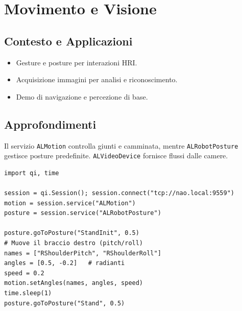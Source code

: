 \chapter{Movimento e Visione}

\section{Contesto e Applicazioni}
\begin{tcolorbox}[title=Contesto e Applicazioni]
\begin{itemize}
  \item Gesture e posture per interazioni HRI.
  \item Acquisizione immagini per analisi e riconoscimento.
  \item Demo di navigazione e percezione di base.
\end{itemize}
\end{tcolorbox}

\section{Approfondimenti}
Il servizio \texttt{ALMotion} controlla giunti e camminata, mentre \texttt{ALRobotPosture} gestisce posture predefinite. \texttt{ALVideoDevice} fornisce flussi dalle camere.

\begin{tcolorbox}[title=Esempi di movimento]
\begin{lstlisting}
import qi, time

session = qi.Session(); session.connect("tcp://nao.local:9559")
motion = session.service("ALMotion")
posture = session.service("ALRobotPosture")

posture.goToPosture("StandInit", 0.5)
# Muove il braccio destro (pitch/roll)
names = ["RShoulderPitch", "RShoulderRoll"]
angles = [0.5, -0.2]   # radianti
speed = 0.2
motion.setAngles(names, angles, speed)
time.sleep(1)
posture.goToPosture("Stand", 0.5)
\end{lstlisting}
\end{tcolorbox}

